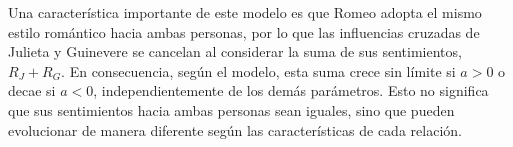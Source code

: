 \documentclass{article}
\begin{document}
Una característica importante de este modelo es que Romeo adopta el mismo estilo romántico hacia ambas personas, por lo que las influencias cruzadas de Julieta y Guinevere se cancelan al considerar la suma de sus sentimientos, $R_J+R_G$. En consecuencia, según el modelo, esta suma crece sin límite si $a>0$ o decae si $a<0$, independientemente de los demás parámetros. Esto no significa que sus sentimientos hacia ambas personas sean iguales, sino que pueden evolucionar de manera diferente según las características de cada relación.
\end{document}
